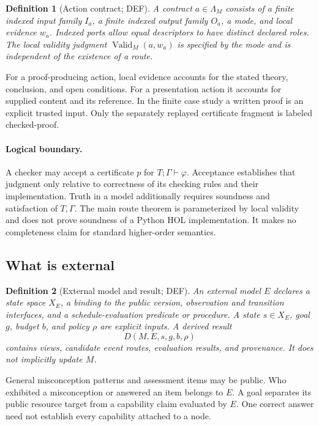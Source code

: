 \documentclass[11pt,a4paper]{article}
\newtheorem{definition}{Definition}[section]
\theoremstyle{remark}
\newcommand{\status}[1]{\textsf{\small #1}}
\begin{document}
\begin{definition}[Action contract; \status{DEF}]\label{def:action}
A contract \(a\in\Lambda_M\) consists of a finite indexed input family \(I_a\),
a finite indexed output family \(O_a\), a mode, and local evidence \(w_a\).
Indexed ports allow equal descriptors to have distinct declared roles.
The local validity judgment \(\operatorname{Valid}_M(a,w_a)\) is specified by
the mode and is independent of the existence of a route.
\end{definition}
For a proof-producing action, local evidence accounts for the stated
theory, conclusion, and open conditions. For a presentation action it
accounts for supplied content and its reference. In the finite case study
a written proof is an explicit trusted input. Only the separately replayed
certificate fragment is labeled checked-proof.

\paragraph{Logical boundary.}
A checker may accept a certificate \(p\) for \(T;\Gamma\vdash\varphi\).
Acceptance establishes that judgment only relative to correctness of its
checking rules and their implementation. Truth in a model additionally
requires soundness and satisfaction of \(T,\Gamma\). The main route theorem
is parameterized by local validity and does not prove soundness of a Python
HOL implementation. It makes no completeness claim for standard higher-order
semantics.

\subsection{What is external}
\begin{definition}[External model and result; \status{DEF}]
An external model \(E\) declares a state space \(X_E\), a binding to the public
version, observation and transition interfaces, and a schedule-evaluation
predicate or procedure. A state \(s\in X_E\), goal \(g\), budget \(b\), and
policy \(\rho\) are explicit inputs. A derived result
\[
 D(M,E,s,g,b,\rho)
\]
contains views, candidate event routes, evaluation results, and provenance.
It does not implicitly update \(M\).
\end{definition}
General misconception patterns and assessment items may be public. Who
exhibited a misconception or answered an item belongs to \(E\). A goal separates
its public resource target from a capability claim evaluated by \(E\).
One correct answer need not establish every capability attached to a node.
\end{document}

